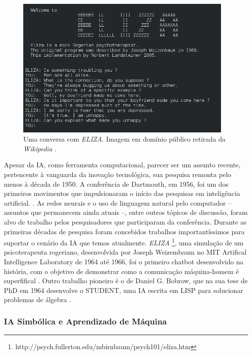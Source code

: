 \documentclass[12pt, a4paper]{article}
\begin{document}
\begin{figure}[ht!]
	\centering
	\includegraphics[width=\textwidth, height=7cm, keepaspectratio=true]{fig/eliza}
	\caption{
		Uma conversa com \emph{ELIZA}. Imagem em domínio público retirada da \emph{Wikipedia}
		\cite{wikipedia_eliza}.
	}
\end{figure}

Apesar da IA, como ferramenta computacional, parecer ser um assunto recente, 
pertencente à vanguarda da inovação tecnológica, sua pesquisa
remonta pelo menos à década de 1950.
A conferência de Dartmouth, em 1956, foi um dos primeiros movimentos que impulsionaram o início das 
pesquisas em inteligência artificial. \cite{dartmouth}.
As redes neurais e o uso de linguagem natural pelo computador -- assuntos que permanecem ainda atuais --, entre outros tópicos de discussão,
foram alvo de trabalho pelos pesquisadores que participaram da conferência. 
Durante as primeiras décadas de pesquisa foram concebidos trabalhos importantíssimos para suportar o cenário da IA que temos atualmente.
\emph{ELIZA} \footnote{http://psych.fullerton.edu/mbirnbaum/psych101/eliza.htm}, 
uma simulação de um psicoterapeuta rogeriano, desenvolvida por Joseph Weizembaum no MIT Artifical Intelligence Laboratory de 1964 até 1966,
foi o primeiro chatbot desenvolvido na história, com o objetivo de demonstrar como a comunicação máquina-homem é superfifical \cite{wiezembaum}.
Outro trabalho pioneiro é o de Daniel G. Bobrow, que na sua tese de PhD em 1964 desenvolve o STUDENT, uma IA escrita em LISP para solucionar problemas
de álgebra \cite{student}.

\subsubsection{IA Simbólica e Aprendizado de Máquina}
\end{document}
